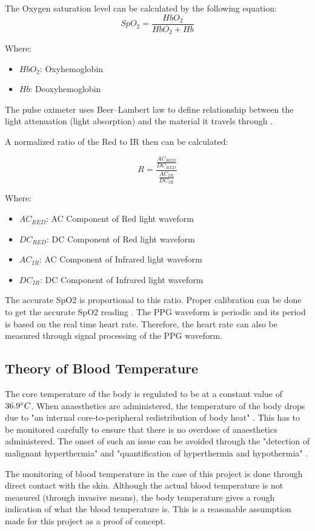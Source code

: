 The Oxygen saturation level can be calculated by the following equation:
\begin{equation}
	SpO_2=\frac{HbO_2}{HbO_2 + Hb}
\end{equation}

Where: 
\begin{itemize}
	\item $HbO_2$: Oxyhemoglobin
	\item $Hb$: Deoxyhemoglobin
\end{itemize}

The pulse oximeter uses Beer–Lambert law \cite{george4} \cite{george5} to define relationship between the light attenuation (light absorption) and the material it travels through \cite{george7}.
  
A normalized ratio of the Red to IR then can be calculated:

\begin{equation}
	R = \frac{\frac{AC_{RED}}{DC_{RED}}}{\frac{AC_{IR}}{DC_{IR}}}
\end{equation}

Where: 
\begin{itemize}
	\item $AC_{RED}$: AC Component of Red light waveform
	\item $DC_{RED}$: DC Component of Red light waveform
	\item $AC_{IR}$: AC Component of Infrared light waveform
	\item $DC_{IR}$: DC Component of Infrared light waveform
\end{itemize}

The accurate SpO2 is proportional to this ratio. Proper calibration can be done to get the accurate SpO2 reading \cite{george10}. The PPG waveform is periodic and its period is based on the real time heart rate. Therefore, the heart rate can also be measured through signal processing of the PPG waveform. 

\subsection{Theory of Blood Temperature}

The core temperature of the body is regulated to be at a constant value of $36.9 \degree C$. When anaesthetics are administered, the temperature of the body drops due to "an internal core-to-peripheral redistribution of body heat" \cite{sessler2008temperature}. This has to be monitored carefully to ensure that there is no overdose of anaesthetics administered. The onset of such an issue can be avoided through the "detection of malignant hyperthermia" and "quantification of hyperthermia and hypothermia" \cite{sessler2008temperature}. 

The monitoring of blood temperature in the case of this project is done through direct contact with the skin. Although the actual blood temperature is not measured (through invasive means), the body temperature gives a rough indication of what the blood temperature is. This is a reasonable assumption made for this project as a proof of concept. 
